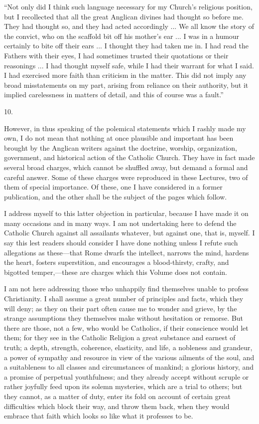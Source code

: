 ``Not only did I think
such language necessary for my Church's religious position, but I
recollected that all the great Anglican divines had thought so before
me. They had thought so, and they had acted accordingly ... We all
know the story of the convict, who on the scaffold bit off his mother's
ear ... I was in a humour certainly to bite off their ears ... I
thought they had taken me in. I had read the Fathers with their eyes,
I had sometimes trusted their quotations or their reasonings ... I had
thought myself safe, while I had their warrant for what I said. I had
exercised more faith than criticism in the matter. This did not imply
any broad misstatements on my part, arising from reliance on their
authority, but it implied carelessness in matters of detail, and this
of course was a fault.''

10.

However, in thus speaking of the polemical statements which
I rashly made my own, I do not mean that nothing at once plausible and
important has been brought by the Anglican writers against the
doctrine, worship, organization, government, and historical action of
the Catholic Church. They have in fact made several broad charges,
which cannot be shuffled away, but demand a formal and careful answer.
Some of these charges were reproduced in these Lectures, two of them
of special importance. Of these, one I have considered in a former
publication, and the other shall be the subject of the pages which
follow.

I address myself to this latter objection in particular, because I
have made it on many occasions and in many ways. I am not undertaking
here to defend the Catholic Church against all assailants whatever,
but against one, that is, myself. I say this lest readers should
consider I have done nothing unless I refute such allegations as these—that
Rome dwarfs the intellect, narrows the mind, hardens the heart,
fosters superstition, and encourages a blood-thirsty, crafty, and
bigotted temper,—these are charges which this Volume does not
contain.


I am not here addressing those who unhappily find themselves unable
to profess Christianity. I shall assume a great number of principles
and facts, which they will deny; as they on their part often cause me
to wonder and grieve, by the strange assumptions they themselves make
without hesitation or remorse. But there are those, not a few, who
would be Catholics, if their conscience would let them; for they see
in the Catholic Religion a great substance and earnest of truth; a
depth, strength, coherence, elasticity, and life, a nobleness and
grandeur, a power of sympathy and resource in view of the various
ailments of the soul, and a suitableness to all classes and
circumstances of mankind; a glorious history, and a promise of
perpetual youthfulness; and they already accept without scruple or
rather joyfully feed upon its solemn mysteries, which are a trial to
others; but they cannot, as a matter of duty, enter its fold on
account of certain great difficulties which block their way, and throw
them back, when they would embrace that faith which looks so like what
it professes to be.

